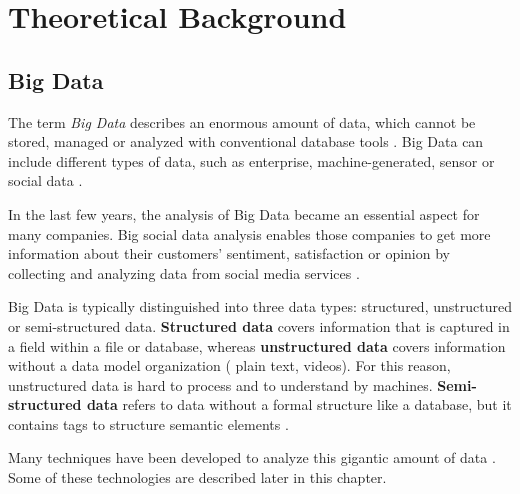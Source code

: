 
\chapter{Theoretical Background}
\label{cha:background}

\section{Big Data}
\label{sec:big-data}
The term \textit{Big Data} describes an enormous amount of data, which cannot be stored, managed or analyzed with conventional database tools \cite{web2011linkeddata}. Big Data can include different types of data, such as enterprise, machine-generated, sensor or social data \cite[3]{oraclebigdata}.

In the last few years, the analysis of Big Data became an essential aspect for many companies. Big social data analysis enables those companies to get more information about their customers' sentiment, satisfaction or opinion by collecting and analyzing data from social media services \cite{oraclebigdata}.

Big Data is typically distinguished into three data types: structured, unstructured or semi-structured data. \textbf{Structured data} covers information that is captured in a field within a file or database, whereas \textbf{unstructured data} covers information without a data model organization (\eg{} plain text, videos). For this reason, unstructured data is hard to process and to understand by machines. \textbf{Semi-structured data} refers to data without a formal structure like a database, but it contains tags to structure semantic elements \cite[2\psqq]{conf/semwiki/SintSSF09}.

Many techniques have been developed to analyze this gigantic amount of data \cite[27]{McKinsey2011}. Some of these technologies are described later in this chapter.

